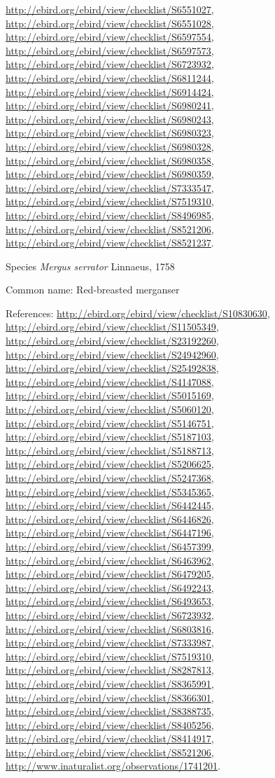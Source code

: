 \documentclass[9pt, article]{memoir}
\begin{document}
\begin{multicols}{2}
\url{http://ebird.org/ebird/view/checklist/S6551027}, 
\url{http://ebird.org/ebird/view/checklist/S6551028}, 
\url{http://ebird.org/ebird/view/checklist/S6597554}, 
\url{http://ebird.org/ebird/view/checklist/S6597573}, 
\url{http://ebird.org/ebird/view/checklist/S6723932}, 
\url{http://ebird.org/ebird/view/checklist/S6811244}, 
\url{http://ebird.org/ebird/view/checklist/S6914424}, 
\url{http://ebird.org/ebird/view/checklist/S6980241}, 
\url{http://ebird.org/ebird/view/checklist/S6980243}, 
\url{http://ebird.org/ebird/view/checklist/S6980323}, 
\url{http://ebird.org/ebird/view/checklist/S6980328}, 
\url{http://ebird.org/ebird/view/checklist/S6980358}, 
\url{http://ebird.org/ebird/view/checklist/S6980359}, 
\url{http://ebird.org/ebird/view/checklist/S7333547}, 
\url{http://ebird.org/ebird/view/checklist/S7519310}, 
\url{http://ebird.org/ebird/view/checklist/S8496985}, 
\url{http://ebird.org/ebird/view/checklist/S8521206}, 
\url{http://ebird.org/ebird/view/checklist/S8521237}.

\vspace{6pt}\noindent\hspace{36pt}Species \textit{Mergus serrator} Linnaeus, 1758


Common name: Red-breasted merganser

References: 
\url{http://ebird.org/ebird/view/checklist/S10830630}, 
\url{http://ebird.org/ebird/view/checklist/S11505349}, 
\url{http://ebird.org/ebird/view/checklist/S23192260}, 
\url{http://ebird.org/ebird/view/checklist/S24942960}, 
\url{http://ebird.org/ebird/view/checklist/S25492838}, 
\url{http://ebird.org/ebird/view/checklist/S4147088}, 
\url{http://ebird.org/ebird/view/checklist/S5015169}, 
\url{http://ebird.org/ebird/view/checklist/S5060120}, 
\url{http://ebird.org/ebird/view/checklist/S5146751}, 
\url{http://ebird.org/ebird/view/checklist/S5187103}, 
\url{http://ebird.org/ebird/view/checklist/S5188713}, 
\url{http://ebird.org/ebird/view/checklist/S5206625}, 
\url{http://ebird.org/ebird/view/checklist/S5247368}, 
\url{http://ebird.org/ebird/view/checklist/S5345365}, 
\url{http://ebird.org/ebird/view/checklist/S6442445}, 
\url{http://ebird.org/ebird/view/checklist/S6446826}, 
\url{http://ebird.org/ebird/view/checklist/S6447196}, 
\url{http://ebird.org/ebird/view/checklist/S6457399}, 
\url{http://ebird.org/ebird/view/checklist/S6463962}, 
\url{http://ebird.org/ebird/view/checklist/S6479205}, 
\url{http://ebird.org/ebird/view/checklist/S6492243}, 
\url{http://ebird.org/ebird/view/checklist/S6493653}, 
\url{http://ebird.org/ebird/view/checklist/S6723932}, 
\url{http://ebird.org/ebird/view/checklist/S6803816}, 
\url{http://ebird.org/ebird/view/checklist/S7333987}, 
\url{http://ebird.org/ebird/view/checklist/S7519310}, 
\url{http://ebird.org/ebird/view/checklist/S8287813}, 
\url{http://ebird.org/ebird/view/checklist/S8365991}, 
\url{http://ebird.org/ebird/view/checklist/S8366301}, 
\url{http://ebird.org/ebird/view/checklist/S8388735}, 
\url{http://ebird.org/ebird/view/checklist/S8405256}, 
\url{http://ebird.org/ebird/view/checklist/S8414917}, 
\url{http://ebird.org/ebird/view/checklist/S8521206}, 
\url{http://www.inaturalist.org/observations/1741201}.


\end{multicols}
\end{document}
